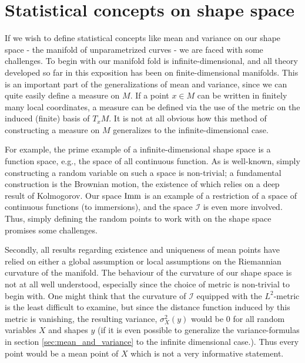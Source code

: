 \message{ !name(mainfile.tex)}\documentclass[a4,danish]{article}
\begin{document}
\section{Statistical concepts on shape space}
\label{sec:statistical_concepts_on_shape_space}

If we wish to define statistical concepts like mean and variance on our shape space - the manifold of unparametrized curves - we are faced with some challenges. To begin with our manifold fold is infinite-dimensional, and all theory developed so far in this exposition has been on finite-dimensional manifolds. This is an important part of the generalizations of mean and variance, since we can quite easily define a measure on $M$. If a point $x \in M$ can be written in finitely many local coordinates, a measure can be defined via the use of the metric on the induced (finite) basis of $T_x M$. It is not at all obvious how this method of constructing a measure on $M$ generalizes to the infinite-dimensional case.

For example, the prime example of a infinite-dimensional shape space is a function space, e.g., the space of all continuous function. As is well-known, simply constructing a random variable on such a space is non-trivial; a fundamental construction is the Brownian motion, the existence of which relies on a deep result of Kolmogorov. Our space $\mathop{}\!\mathrm{Imm}$ is an example of a restriction of a space of continuous functions (to immersions), and the space $\mathcal{I}$ is even more involved. Thus, simply defining the random points to work with on the shape space promises some challenges.

Secondly, all results regarding existence and uniqueness of mean points have relied on either a global assumption or local assumptions on the Riemannian curvature of the manifold. The behaviour of the curvature of our shape space is not at all well understood, especially since the choice of metric is non-trivial to begin with. One might think that the curvature of $\mathcal{I}$ equipped with the $L^2$-metric is the least difficult to examine, but since the distance function induced by this metric is vanishing, the resulting variance, $\sigma^2_X(y)$ would be $0$ for all random variables $X$ and shapes $y$ (if it is even possible to generalize the variance-formulas in section \ref{sec:mean_and_variance} to the infinite dimensional case.). Thus every point would be a mean point of $X$ which is not a very informative statement.
\end{document}
